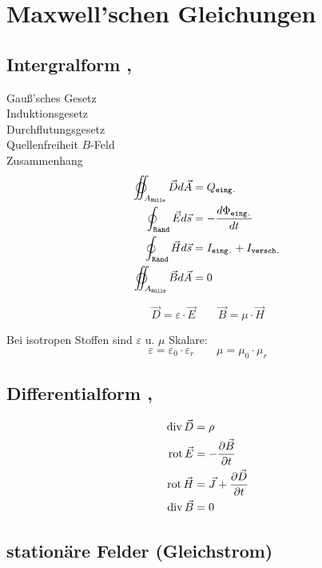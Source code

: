 \section{Maxwell’schen Gleichungen}

\subsection{Intergralform , }
Gauß'sches Gesetz\\
Induktionsgesetz\\
Durchflutungsgesetz\\
Quellenfreiheit $B$-Feld\\
Zusammenhang
\begin{align*}
    \varoiint_{A_\texttt{Hülle}} \vec{D} d \vec{A} & = Q_\texttt{eing.}                      \\
    \oint_\texttt{Rand} \vec{E} d \vec{s}          & = -\dfrac{d\Phi_\texttt{eing.}}{dt}     \\
    \oint_\texttt{Rand} \vec{H} d \vec{s}          & = I_\texttt{eing.} + I_\texttt{versch.} \\
    \varoiint_{A_\texttt{Hülle}} \vec{B} d \vec{A} & = 0
\end{align*}

\[
    \vec{D} = \varepsilon \cdot \vec{E} \qquad
    \vec{B} = \mu \cdot \vec{H}
\]

Bei isotropen Stoffen sind $\varepsilon$ u. $\mu$ Skalare:
\[
    \varepsilon = \varepsilon_0 \cdot \varepsilon_r \qquad \mu = \mu_0 \cdot \mu_r
\]

\subsection{Differentialform , }
\begin{align*}
    \operatorname{div} \vec{D} & = \rho                                           \\
    \operatorname{rot} \vec{E} & = -\dfrac{\partial \vec{B}}{\partial t}          \\
    \operatorname{rot} \vec{H} & = \vec{J} + \dfrac{\partial \vec{D}}{\partial t} \\
    \operatorname{div} \vec{B} & = 0
\end{align*}

\subsection{stationäre Felder (Gleichstrom)}

